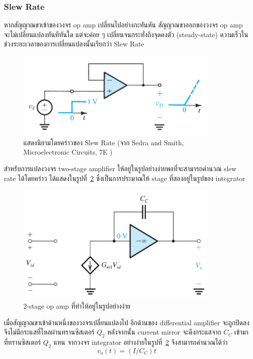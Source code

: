 \documentclass[a4paper, 11pt, oneside]{book} %
\begin{document}
\subsubsection{Slew Rate}

หากสัญญาณขาเข้าของวงจร op amp เปลี่ยนไปอย่างกะทันหัน สัญญาณขาออกของวงจร op amp จะไม่เปลี่ยนแปลงทันทีทันใด แต่จะค่อย ๆ เปลี่ยนจนกระทั่งถึงจุดคงตัว (steady-state) ความเร็วในช่วงระยะเวลาของการเปลี่ยนแปลงนั้นเรียกว่า Slew Rate

\begin{figure}[h]
    \centering
    \includegraphics[width= 10cm]{slew_rate}
    \caption{แสดงนิยามโดยคร่าวของ Slew Rate (จาก Sedra and Smith, Microelectronic Circuits, 7E \cite{Sedra15})}
    \label{slew_rate}
\end{figure}

สำหรับการแปลงวงจร two-stage amplifier ให้อยู่ในรูปอย่างง่ายพอที่จะสามารถคำนวณ slew rate ได้โดยคร่าว ได้แสดงในรูปที่~\ref{opamp_as_integrator} ซึ่งเป็นการประมาณให้ stage ที่สองอยู่ในรูปของ integrator

\begin{figure}[h]
    \centering
    \includegraphics[width = 10cm]{opamp_as_integrator}
    \caption{2-stage op amp ที่ทำให้อยู่ในรูปอย่างง่าย}
    \label{opamp_as_integrator}
\end{figure}

เมื่อสัญญาณขาเข้าด้านหนึ่งของวงจรเปลี่ยนแปลงไป อีกด้านของ differential amplifier จะถูกปิดลง จึงไม่มีกระแสที่ไหลผ่านทรานซิสเตอร์ $Q_2$ หลังจากนั้น current mirror จะดึงกระแสจาก $C_C$ เข้ามาที่ทรานซิสเตอร์ $Q_2$ แทน จากวงจร integrator อย่างง่ายในรูปที่~\ref{opamp_as_integrator} จึงสามารถคำนวณได้ว่า 
\begin{equation}
    v_o(t) = (I/C_C)t
\end{equation}
\end{document}
